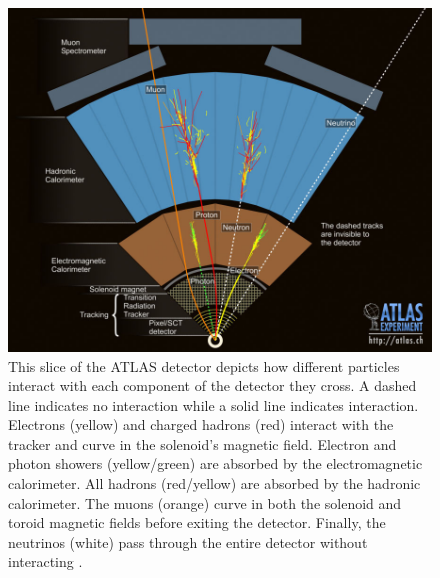 \begin{figure}[!htbp] 
\begin{center}
\includegraphics[width=0.9\linewidth]{figures/atlas/detector_interactions}
\caption{This slice of the ATLAS detector depicts how different particles
interact with each component of the detector they cross.  A dashed line
indicates no interaction while a solid line indicates interaction. Electrons
(yellow) and charged hadrons (red) interact with the tracker and curve in
the solenoid's magnetic field.  Electron and photon showers (yellow/green) are
absorbed by the electromagnetic calorimeter.  All hadrons (red/yellow) are
absorbed by the hadronic calorimeter. The muons (orange) curve in both the
solenoid and toroid magnetic fields before exiting the detector. Finally, the
neutrinos (white) pass through the entire detector without interacting
\cite{Pasztor:2048697}.} 
\label{fig:detector_interactions}
 \end{center}
\end{figure}

 
 



